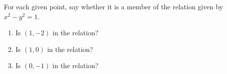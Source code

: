 \documentclass{ximera}
\author{Kenneth Berglund}
\begin{document}
\begin{exercise}
For each given point, say whether it is a member of the relation given by $x^2 - y^2 = 1$. 

\begin{enumerate}
\item Is $(1, -2)$  in the relation? 
\begin{multipleChoice}
\end{multipleChoice}
\item Is $(1, 0)$  in the relation? 
\begin{multipleChoice}
\end{multipleChoice}
\item Is $(0, -1)$  in the relation? 
\begin{multipleChoice}
\end{multipleChoice}

\end{enumerate}



\end{exercise}
\end{document}
